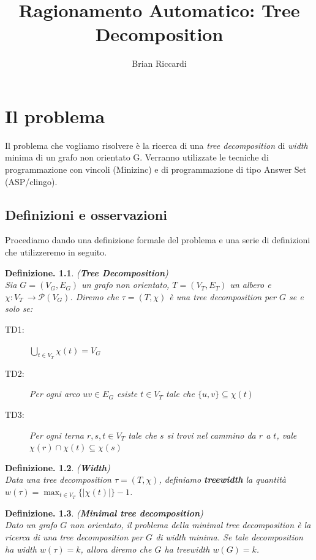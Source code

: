 \documentclass{report}
\title{Ragionamento Automatico: Tree Decomposition}
\author{Brian Riccardi}
\date{}
\newtheorem{defi}{Definizione.}
\begin{document}
\maketitle
\tableofcontents

\newpage

\chapter{Il problema}
Il problema che vogliamo risolvere è la ricerca di una \textit{tree decomposition} di \textit{width} minima di un grafo non orientato G.
Verranno utilizzate le tecniche di programmazione con vincoli (Minizinc) e di programmazione di tipo Answer Set (ASP/clingo).

\section{Definizioni e osservazioni}

Procediamo dando una definizione formale del problema e una serie di definizioni che utilizzeremo in seguito.

\begin{defi}(\textbf{Tree Decomposition})\\
Sia $G = (V_G, E_G)$ un grafo non orientato, $T = (V_T, E_T)$ un albero e \\$\chi{}: V_T~\longrightarrow{} \mathscr{P}(V_G)$.
Diremo che $\tau = (T, \chi)$ è una \textit{tree decomposition} per $G$ se e solo se:
\begin{description}
	\item[TD1:] $\displaystyle\bigcup_{t \in V_T}{\chi{}(t)} = V_G$
	\item[TD2:] Per ogni arco $uv \in E_G$ esiste $t \in V_T$ tale che $\{u, v\} \subseteq \chi{}(t)$
	\item[TD3:] Per ogni terna $r, s, t \in V_T$ tale che $s$ si trovi nel cammino da $r$ a $t$, vale $\chi(r) \cap \chi(t) \subseteq \chi(s)$
\end{description}
\end{defi}

\begin{defi}(\textbf{Width})\\
Data una \textit{tree decomposition} $\tau = (T, \chi)$, definiamo \textbf{treewidth} la quantità \\
$w(\tau) = \displaystyle\max_{t \in V_T}\{|\chi{}(t)|\}-1$.
\end{defi}

\begin{defi}(\textbf{Minimal tree decomposition})\\
Dato un grafo $G$ non orientato, il problema della \textit{minimal tree decomposition} è la ricerca di una tree decomposition per $G$
di \textit{width} minima. Se tale decomposition ha width $w(\tau)=k$, allora diremo che $G$ ha treewidth $w(G)=k$.
\end{defi}
\end{document}
